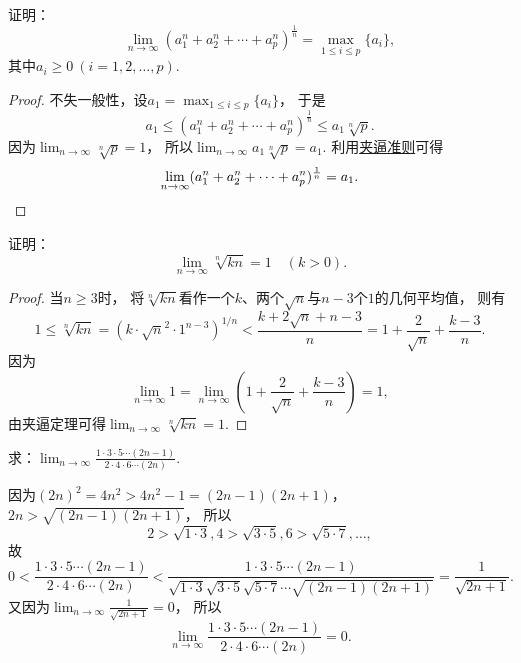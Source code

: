\begin{example}
证明：\[
	\lim_{n\to\infty} (a_1^n + a_2^n + \dotsb + a_p^n)^{\frac1n}
	= \max_{1\leq i\leq p} \{a_i\},
\]
其中\(a_i\geq0\ (i=1,2,\dotsc,p)\).
\begin{proof}
不失一般性，设\(a_1 = \max_{1\leq i\leq p} \{a_i\}\)，
于是\[
	a_1 \leq (a_1^n + a_2^n + \dotsb + a_p^n)^{\frac1n} \leq a_1 \sqrt[n]{p}.
\]
因为\(\lim_{n\to\infty} \sqrt[n]{p} = 1\)，
所以\(\lim_{n\to\infty} a_1 \sqrt[n]{p} = a_1\).
利用\hyperref[theorem:数列极限.夹逼准则]{夹逼准则}可得\[
	\lim_{n\to\infty} (a_1^n + a_2^n + \dotsb + a_p^n)^{\frac1n} = a_1.
	\qedhere
\]
\end{proof}
\end{example}

\begin{example}
证明：\begin{equation}\label{equation:数列极限.重要极限3}
	\lim_{n\to\infty} \sqrt[n]{k n} = 1
	\quad(k>0).
\end{equation}
\begin{proof}
当\(n \geq 3\)时，
将\(\sqrt[n]{k n}\)看作一个\(k\)、两个\(\sqrt{n}\)与\(n-3\)个\(1\)的几何平均值，
则有\[
	1 \leq \sqrt[n]{k n} = (k \cdot \sqrt{n}^2 \cdot 1^{n-3})^{1/n}
	< \frac{k + 2\sqrt{n} + n-3}{n}
	= 1 + \frac{2}{\sqrt{n}} + \frac{k-3}{n}.
\]
因为\[
	\lim_{n\to\infty} 1
	= \lim_{n\to\infty} \left(1 + \frac{2}{\sqrt{n}} + \frac{k-3}{n}\right) = 1,
\]
由夹逼定理可得\(\lim_{n\to\infty} \sqrt[n]{k n} = 1\).
\end{proof}
\end{example}

\begin{example}
求：\(\lim_{n\to\infty} \frac{1 \cdot 3 \cdot 5 \dotsm (2n-1)}{2 \cdot 4 \cdot 6 \dotsm (2n)}\).
\begin{solution}
因为\((2n)^2 = 4n^2 > 4n^2-1 = (2n-1)(2n+1)\)，\(2n > \sqrt{(2n-1)(2n+1)}\)，
所以\[
	2 > \sqrt{1 \cdot 3},
	4 > \sqrt{3 \cdot 5},
	6 > \sqrt{5 \cdot 7},
	\dotsc,
\]
故\[
	0 < \frac{1 \cdot 3 \cdot 5 \dotsm (2n-1)}{2 \cdot 4 \cdot 6 \dotsm (2n)}
	< \frac{1 \cdot 3 \cdot 5 \dotsm (2n-1)}{\sqrt{1 \cdot 3} \sqrt{3 \cdot 5} \sqrt{5 \cdot 7} \dotsm \sqrt{(2n-1)(2n+1)}}
	= \frac{1}{\sqrt{2n+1}}.
\]
又因为\(\lim_{n\to\infty} \frac{1}{\sqrt{2n+1}} = 0\)，
所以\begin{equation}\label{equation:数列极限.重要极限4}
	\lim_{n\to\infty} \frac{1 \cdot 3 \cdot 5 \dotsm (2n-1)}{2 \cdot 4 \cdot 6 \dotsm (2n)} = 0.
\end{equation}
\end{solution}
\end{example}

